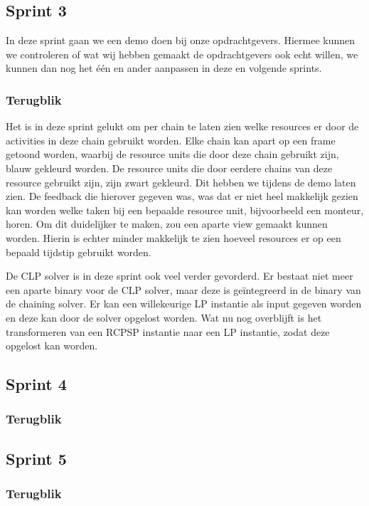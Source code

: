 \subsection{Sprint 3}
In deze sprint gaan we een demo doen bij onze opdrachtgevers. Hiermee kunnen we controleren of wat wij hebben gemaakt de opdrachtgevers ook echt willen, we kunnen dan nog het \'e\'en en ander aanpassen in deze en volgende sprints. 

\subsubsection*{Terugblik}
Het is in deze sprint gelukt om per chain te laten zien welke resources er door de activities in deze chain gebruikt worden. Elke chain kan apart op een frame getoond worden, waarbij de resource units die door deze chain gebruikt zijn, blauw gekleurd worden. De resource units die door eerdere chains van deze resource gebruikt zijn, zijn zwart gekleurd. Dit hebben we tijdens de demo laten zien. De feedback die hierover gegeven was, was dat er niet heel makkelijk gezien kan worden welke taken bij een bepaalde resource unit, bijvoorbeeld een monteur, horen. Om dit duidelijker te maken, zou een aparte view gemaakt kunnen worden. Hierin is echter minder makkelijk te zien hoeveel resources er op een bepaald tijdstip gebruikt worden.

De CLP solver is in deze sprint ook veel verder gevorderd. Er bestaat niet meer een aparte binary voor de CLP solver, maar deze is ge\"integreerd in de binary van de chaining solver. Er kan een willekeurige LP instantie als input gegeven worden en deze kan door de solver opgelost worden. Wat nu nog overblijft is het transformeren van een RCPSP instantie naar een LP instantie, zodat deze opgelost kan worden.

\subsection{Sprint 4}

\subsubsection*{Terugblik}

\subsection{Sprint 5}

\subsubsection*{Terugblik}

